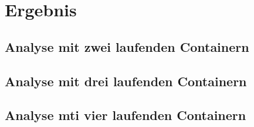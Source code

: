 \section{Ergebnis}\label{Ergebnis}


\subsection{Analyse mit zwei laufenden Containern}



\subsection{Analyse mit drei laufenden Containern}

\subsection{Analyse mti vier laufenden Containern}
